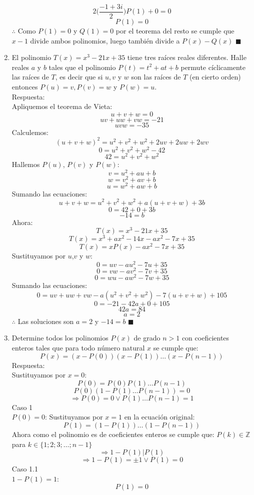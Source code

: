 \documentclass{book}
\newcommand{\Z}{\mathbb{Z}} \def\max{\mathop{\mbox{\rm máx}}} %
\begin{document}
\begin{enumerate}
        $$ 2\bigg(\frac{-1+3i}{2}\bigg)P(1)+0=0$$
        $$P(1)=0$$
        $\therefore$ Como  $P(1)=0$ y $Q(1)=0$ por el teorema del resto se cumple que $x-1$ divide ambos polinomios, luego también divide a $P(x)-Q(x)$ $\blacksquare$\\
        \item El polinomio $T(x) = x^3 - 21x + 35$ tiene tres raíces reales diferentes. Halle reales $a$ y $b$ tales que el polinomio $P(t) = t^2 + at + b$ permute cíclicamente las raíces de $T$, es decir que si $u,v$ y $w$ son las raíces de $T$ (en cierto orden) entonces $P(u) = v,P(v) = w$ y $P(w) = u$.\\
        Respuesta:\\
        Apliquemos el teorema de Vieta:
        $$u+v+w=0$$
        $$uv+uw+vw=-21$$
        $$uvw=-35$$
        Calculemos:
        $$(u+v+w)^2=u^2+v^2+w^2+2uv+2uw+2wv$$
        $$0=u^2+v^2+w^2-42$$
        $$42=u^2+v^2+w^2$$
        Hallemos $P(u)$, $P(v)$ y $P(w)$:
        $$v=u^2+au+b$$
        $$w=v^2+av+b$$
        $$u=w^2+aw+b$$
        Sumando las ecuaciones:
        $$u+v+w=u^2+v^2+w^2+a(u+v+w)+3b$$
        $$0=42+0+3b$$
        $$-14=b$$
        Ahora:
        $$T(x) = x^3  -21x + 35$$
        $$T(x)= x^3+ax^2-14x-ax^2-7x+35$$
        $$T(x)= xP(x)-ax^2-7x+35$$
        Sustituyamos por $u$,$v$ y $w$:
        $$0=uv-au^2-7u+35$$
        $$0=vw-av^2-7v+35$$
        $$0=wu-aw^2-7w+35$$
        Sumando las ecuaciones:
        $$0=uv+uw+vw-a(u^2+v^2+w^2 )-7(u+v+w)+105$$
        $$0=-21-42a+0+105$$
        $$42a=84$$
        $$a=2$$
        $\therefore$ Las soluciones son $a=2$ y $-14=b$ $\blacksquare$\\
        \item Determine todos los polinomios $P(x)$ de grado $n>1$ con coeficientes enteros tales que para todo número natural $x$ se cumple que:
        $$P(x)=(x-P(0))(x-P(1))\ldots(x-P(n-1))$$
        Respuesta:\\
        Sustituyamos por $x=0$:
        $$P(0)=P(0)P(1)\ldots P(n-1)$$
        $$P(0)(1-P(1)\ldots P(n-1))=0$$
        $$\Rightarrow P(0)=0\vee P(1)\ldots P(n-1)=1$$
        Caso 1 \\$P(0)=0$:
        Sustituyamos por $x=1$ en la ecuación original:
        $$P(1)=(1-P(1))\ldots(1-P(n-1))$$
        Ahora como el polinomio es de coeficientes enteros se cumple que: $P(k)\in\Z$ para $k\in \{1;2;3;\ldots;n-1\}$
        $$\Rightarrow 1-P(1)|P(1)$$
        $$\Rightarrow 1-P(1)=\pm 1\vee P(1)=0$$
        Caso 1.1 \\$1-P(1)=1$:
        $$P(1)=0$$

\end{enumerate}
\end{document}
